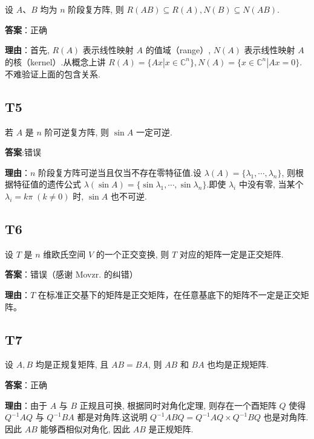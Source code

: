 \documentclass{article}
\begin{document}
\par 设 $A、B$ 均为 $n$ 阶段复方阵, 则 $R(AB)\subseteq R(A), N(B)\subseteq N(AB)$.

\par \textbf{答案}：正确

\par \textbf{理由}：首先,  $R(A)$ 表示线性映射 $A$ 的值域（range）, $N(A)$ 表示线性映射 $A$ 的核（kernel）.从概念上讲 $R(A)=\{Ax | x\in \mathbb C^n\}, N(A)=\{x\in \mathbb C^n|Ax=0\}$.不难验证上面的包含关系.

\subsection{T5}

\par 若 $A$ 是 $n$ 阶可逆复方阵, 则 $\sin A$ 一定可逆.

\par \textbf{答案}:错误

\par \textbf{理由}：$n$ 阶段复方阵可逆当且仅当不存在零特征值.设 $\lambda(A)=\{\lambda_1, \cdots, \lambda_n\}$, 则根据特征值的遗传公式 $\lambda(\sin A)=\{\sin \lambda_1, \cdots, \sin \lambda_n\}$.即使 $\lambda_i$ 中没有零, 当某个 $\lambda_i=k\pi\;(k\neq 0)$ 时, $\sin A$ 也不可逆.

\subsection{T6}

\par 设 $T$ 是 $n$ 维欧氏空间 $V$ 的一个正交变换, 则 $T$ 对应的矩阵一定是正交矩阵.

\par \textbf{答案}：错误（感谢 Movzr. 的纠错）

\par \textbf{理由}：$T$ 在标准正交基下的矩阵是正交矩阵，在任意基底下的矩阵不一定是正交矩阵。

\subsection{T7}

\par 设 $A, B$ 均是正规复矩阵, 且 $AB=BA$, 则 $AB$ 和 $BA$ 也均是正规矩阵.

\par \textbf{答案}：正确

\par \textbf{理由}：由于 $A$ 与 $B$ 正规且可换, 根据同时对角化定理, 则存在一个酉矩阵 $Q$ 使得 $Q^{-1}AQ$ 与 $Q^{-1}BA$ 都是对角阵.这说明 $Q^{-1}ABQ = Q^{-1}AQ\times Q^{-1}BQ$ 也是对角阵.因此 $AB$ 能够酉相似对角化, 因此 $AB$ 是正规矩阵.
\end{document}
